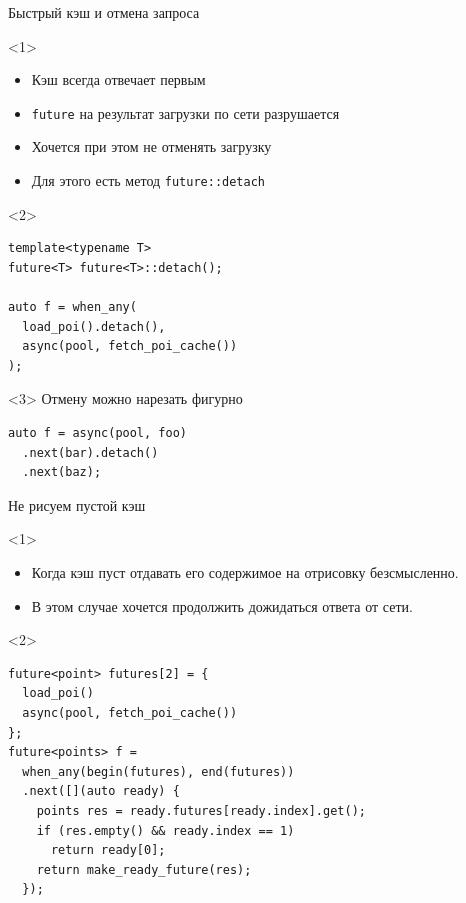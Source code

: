 \documentclass[aspectratio=169,hyperref={unicode},17pt]{beamer}
\begin{document}
\begin{frame}[fragile,t]{Быстрый кэш и отмена запроса}
\begin{onlyenv}<1>
\begin{itemize}
 \item Кэш всегда отвечает первым
 \item \texttt{future} на результат загрузки по сети разрушается
 \item Хочется при этом не отменять загрузку
 \item Для этого есть метод \texttt{future::detach}
\end{itemize}
\end{onlyenv}
\begin{onlyenv}<2>
\begin{lstlisting}[style=cppcode]
template<typename T>
future<T> future<T>::detach();

auto f = when_any(
  load_poi().detach(),
  async(pool, fetch_poi_cache())
);
\end{lstlisting}
\end{onlyenv}
\begin{onlyenv}<3>
Отмену можно нарезать фигурно
\begin{lstlisting}[style=cppcode]
auto f = async(pool, foo)
  .next(bar).detach()
  .next(baz);
\end{lstlisting}
\end{onlyenv}
\end{frame}

\begin{frame}[fragile,t]{Не рисуем пустой кэш}
\begin{onlyenv}<1>
\begin{itemize}
 \item Когда кэш пуст отдавать его содержимое на отрисовку безсмысленно.
 \item В этом случае хочется продолжить дожидаться ответа от сети.
\end{itemize}
\end{onlyenv}
\begin{onlyenv}<2>
\begin{lstlisting}[style=cppcode]
future<point> futures[2] = {
  load_poi()
  async(pool, fetch_poi_cache())
};
future<points> f =
  when_any(begin(futures), end(futures))
  .next([](auto ready) {
    points res = ready.futures[ready.index].get();
    if (res.empty() && ready.index == 1)
      return ready[0];
    return make_ready_future(res);
  });
\end{lstlisting}
\end{onlyenv}
\end{frame}
\end{document}
